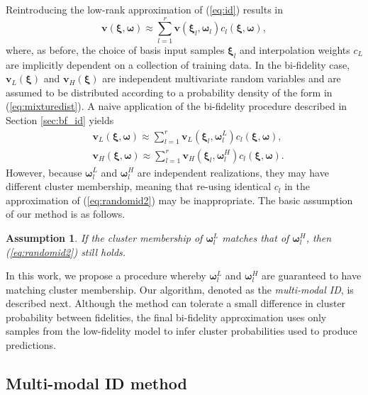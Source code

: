 \documentclass[preprint,10pt]{elsarticle}
\newtheorem{assumption}{Assumption}
\begin{document}
Reintroducing the low-rank approximation of (\ref{eq:id}) results in
%
\begin{equation}
    \label{eq:randomid}
    \boldsymbol v(\boldsymbol\xi, \bm \omega) \approx \sum_{l=1}^r \boldsymbol v(\boldsymbol\xi_l, \bm \omega_l) c_l(\boldsymbol\xi, \bm \omega),
\end{equation}
%
where, as before, the choice of basis input samples $\bm \xi_l$ and interpolation weights $c_L$ are implicitly dependent on a collection of training data. In the bi-fidelity case, $\bm v_L(\bm \xi)$ and $\bm v_H(\bm \xi)$ are independent multivariate random variables and are assumed to be distributed according to a probability density of the form in (\ref{eq:mixturedist}). A naive application of the bi-fidelity procedure described in Section \ref{sec:bf_id} yields
%
\begin{align}
    & \boldsymbol v_L(\bm \xi, \bm \omega) \approx \sum_{l=1}^r \boldsymbol v_L(\bm \xi_l, \bm \omega_l^L) c_l(\bm \xi, \bm \omega), \\
    & \boldsymbol v_H(\bm \xi, \bm \omega) \approx \sum_{l=1}^r \boldsymbol v_H(\bm \xi_l, \bm \omega_l^H) c_l(\bm \xi, \bm \omega) \label{eq:randomid2}.
\end{align}
%
However, because $\bm \omega_l^L$ and $\bm \omega_l^H$ are independent realizations, they may have different cluster membership, meaning that re-using identical $c_l$ in the approximation of (\ref{eq:randomid2}) may be inappropriate. The basic assumption of our method is as follows.
%
\begin{assumption}
    If the cluster membership of $\bm \omega_l^L$ matches that of $\bm \omega_l^H$, then (\ref{eq:randomid2}) still holds.
\end{assumption}
%

In this work, we propose a procedure whereby $\bm \omega_l^L$ and $\bm \omega_l^H$ are guaranteed to have matching cluster membership. Our algorithm, denoted as the \textit{multi-modal ID}, is described next. Although the method can tolerate a small difference in cluster probability between fidelities, the final bi-fidelity approximation uses only samples from the low-fidelity model to infer cluster probabilities used to produce predictions.





\subsection{Multi-modal ID method}
\label{sec:mmidmethod}
\end{document}

